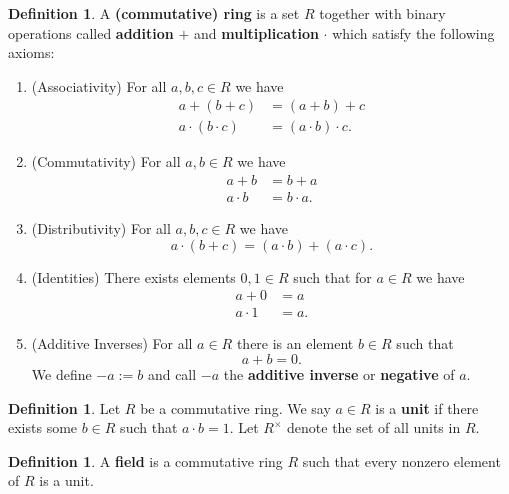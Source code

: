 \documentclass[11pt]{article}
\theoremstyle{definition}
\newtheorem{definition}[theorem]{Definition}
\numberwithin{equation}{subsection}
\begin{document}
\begin{definition}
    A \textbf{(commutative) ring} is a set $R$ together with binary operations called \textbf{addition} $+$ and \textbf{multiplication} $\cdot$ which satisfy the following axioms:
    \begin{enumerate}
        \item (Associativity) For all $a, b, c \in R$ we have
        \begin{align*}
            a + (b + c) &= (a + b) + c\\
            a \cdot (b \cdot c) &= (a \cdot b) \cdot c.
        \end{align*}

        \item (Commutativity) For all $a, b \in R$ we have
        \begin{align*}
            a + b &= b + a\\
            a \cdot b &= b \cdot a.
        \end{align*}

        \item (Distributivity) For all $a, b, c\in R$ we have
        \[
            a\cdot (b + c) = (a\cdot b) + (a \cdot c).
        \]

        \item (Identities) There exists elements $0, 1 \in R$ such that for $a \in R$ we have
        \begin{align*}
            a + 0 &= a\\
            a \cdot 1 &= a.
        \end{align*}

        \item (Additive Inverses) For all $a \in R$ there is an element $b \in R$ such that
        \[
            a + b = 0.
        \]
        We define $-a := b$ and call $-a$ the \textbf{additive inverse} or \textbf{negative} of $a$.
    \end{enumerate}
\end{definition}

\begin{definition}
    Let $R$ be a commutative ring.
    We say $a \in R$ is a \textbf{unit} if there exists some $b \in R$ such that $a\cdot b = 1$.
    Let $R^\times$ denote the set of all units in $R$.
\end{definition}

\begin{definition}
    A \textbf{field} is a commutative ring $R$ such that every nonzero element of $R$ is a unit.
\end{definition}
\end{document}
